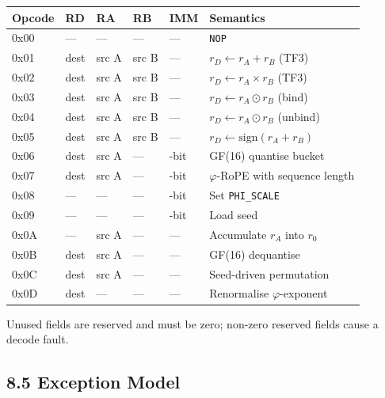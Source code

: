 \begin{longtable}[]{@{}
  >{\raggedright\arraybackslash}p{}
  >{\raggedright\arraybackslash}p{}
  >{\raggedright\arraybackslash}p{}
  >{\raggedright\arraybackslash}p{}
  >{\raggedright\arraybackslash}p{}
  >{\raggedright\arraybackslash}p{}@{}}
\toprule\noalign{}
Opcode & RD & RA & RB & IMM & Semantics \\
\midrule\noalign{}
\endhead
\bottomrule\noalign{}
\endlastfoot
0x00 & --- & --- & --- & --- & \texttt{NOP} \\
0x01 & dest & src A & src B & --- & \(r_D \leftarrow r_A + r_B\) (TF3) \\
0x02 & dest & src A & src B & --- & \(r_D \leftarrow r_A \times r_B\) (TF3) \\
0x03 & dest & src A & src B & --- & \(r_D \leftarrow r_A \odot r_B\) (bind) \\
0x04 & dest & src A & src B & --- & \(r_D \leftarrow r_A \odot r_B\) (unbind) \\
0x05 & dest & src A & src B & --- &
\(r_D \leftarrow \text{sign}(r_A + r_B)\) \\
0x06 & dest & src A & --- & 4-bit & GF(16) quantise bucket \\
0x07 & dest & src A & --- & 13-bit &
\(\varphi\)-RoPE with sequence length \\
0x08 & --- & --- & --- & 4-bit & Set
\texttt{PHI\_SCALE} \\
0x09 & --- & --- & --- & 13-bit & Load seed \\
0x0A & --- & src A & --- & --- & Accumulate
\(r_A\) into \(r_0\) \\
0x0B & dest & src A & --- & --- & GF(16) dequantise \\
0x0C & dest & src A & --- & --- & Seed-driven
permutation \\
0x0D & dest & --- & --- & --- & Renormalise
\(\varphi\)-exponent \\
\end{longtable}

Unused fields are reserved and must be zero;
non-zero reserved fields cause a decode fault.

\subsection{8.5 Exception
Model}\label{fa_26:exception-model}

